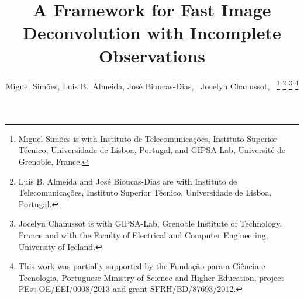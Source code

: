 \documentclass[10pt,twocolumn,twoside]{IEEEtran}
\begin{document}
%
\title{A Framework for Fast Image Deconvolution with Incomplete Observations}
%
%
%

\author{Miguel Sim\~{o}es, Luis B.\ Almeida, Jos\'{e} Bioucas-Dias,~ Jocelyn Chanussot,~%
\thanks{Miguel Sim\~{o}es is with Instituto de Telecomunica\c{c}\~{o}es, Instituto
Superior T\'{e}cnico, Universidade de Lisboa, Portugal, and GIPSA-Lab, Universit\'{e} de Grenoble, France.}%
\thanks{Luis B. Almeida and Jos\'{e} Bioucas-Dias are with Instituto de Telecomunica\c{c}\~{o}es, Instituto
Superior T\'{e}cnico, Universidade de Lisboa, Portugal.}%
\thanks{Jocelyn Chanussot is with GIPSA-Lab, Grenoble Institute of Technology, France and with the Faculty of Electrical and Computer Engineering, University of Iceland.}%
\thanks{This work was partially supported by the Funda\c{c}\~{a}o para a Ci\^{e}ncia e Tecnologia, Portuguese Ministry of Science and Higher Education, project PEst-OE/EEI/0008/2013 and grant SFRH/BD/87693/2012.}}

% 
%
\end{document}
